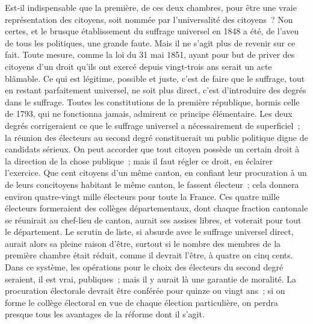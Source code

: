 \documentclass[french,twoside]{book} %
\begin{document}
Est-il indispensable que la première, de ces deux chambres, pour être une vraie représentation des citoyens, soit nommée par l’universalité des citoyens ? Non certes, et le brusque établissement du suffrage universel en 1848 a été, de l’aveu de tous les politiques, une grande faute. Mais il ne s’agit plus de revenir sur ce fait. Toute mesure, comme la loi du 31 mai 1851, ayant pour but de priver des citoyens d’un droit qu’ils ont exercé depuis vingt-trois ans serait un acte blâmable. Ce qui est légitime, possible et juste, c’est de faire que le suffrage, tout en restant parfaitement universel, ne soit plus direct, c’est d’introduire des degrés dans le suffrage. Toutes les constitutions de la première république, hormis celle de 1793, qui ne fonctionna jamais, admirent ce principe élémentaire. Les deux degrés corrigeraient ce que le suffrage universel a nécessairement de superficiel ; la réunion des électeurs au second degré constituerait un public politique digne de candidats sérieux. On peut accorder que tout citoyen possède un certain droit à la direction de la chose publique ; mais il faut régler ce droit, en éclairer l’exercice. Que cent citoyens d’un même canton, en confiant leur procuration à un de leurs concitoyens habitant le même canton, le fassent électeur ; cela donnera environ quatre-vingt mille électeurs pour toute la France. Ces quatre mille électeurs formeraient des collèges départementaux, dont chaque fraction cantonale se réunirait au chef-lieu de canton, aurait ses assises libres, et voterait pour tout le département. Le scrutin de liste, si absurde avec le suffrage universel direct, aurait alors sa pleine raison d’être, surtout si le nombre des membres de la première chambre était réduit, comme il devrait l’être, à quatre on cinq cents. Dans ce système, les opérations pour le choix des électeurs du second degré seraient, il est vrai, publiques ; mais il y aurait là une garantie de moralité. La procuration électorale devrait être conférée pour quinze ou vingt ans ; si on forme le collège électoral en vue de chaque élection particulière, on perdra presque tous les avantages de la réforme dont il s’agit.\par
\end{document}
